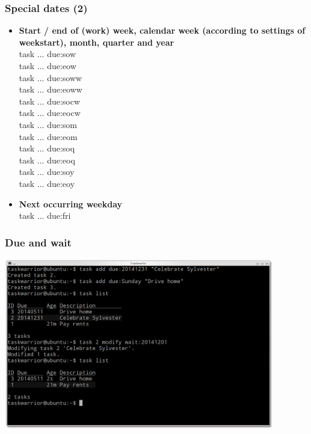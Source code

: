\documentclass[t,handout]{beamer}
\begin{document}
\begin{frame}\frametitle{Special dates (2)}
\begin{itemize}
\item \textbf{Start / end of (work) week, calendar week (according to settings of weekstart), month, quarter and year} \\
task ... due:sow \\
task ... due:eow \\
task ... due:soww \\
task ... due:eoww \\
task ... due:socw \\
task ... due:eocw \\
task ... due:som \\
task ... due:eom \\
task ... due:soq \\
task ... due:eoq \\
task ... due:soy \\
task ... due:eoy \\
\item \textbf{Next occurring weekday} \\
task ... due:fri
\end{itemize}
\end{frame}

\begin{frame}[fragile]\frametitle{Due and wait}
\begin{center} %
\includegraphics[width=11.8cm,height=7.5cm]{due-and-wait.png}
\end{center}
\end{frame}
\end{document}
